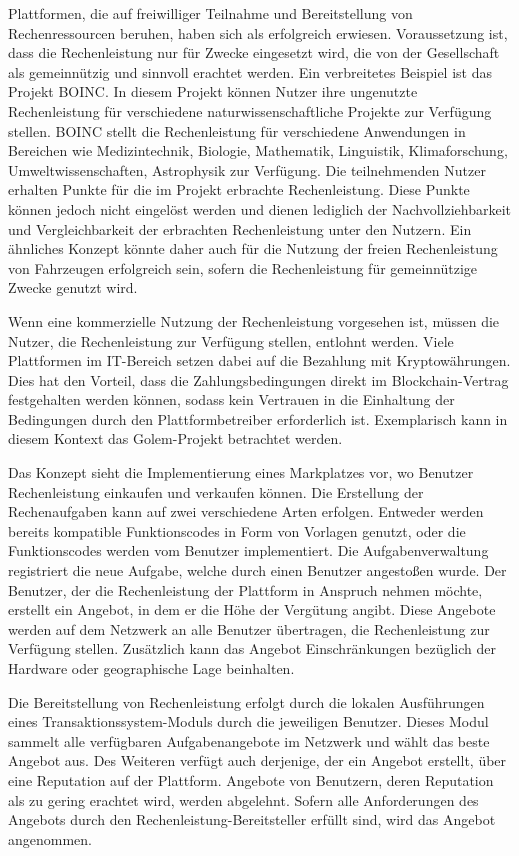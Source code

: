Plattformen, die auf freiwilliger Teilnahme und Bereitstellung von Rechenressourcen beruhen, haben sich als erfolgreich erwiesen. Voraussetzung ist, dass die Rechenleistung nur für Zwecke eingesetzt wird, die von der Gesellschaft als gemeinnützig und sinnvoll erachtet werden. Ein verbreitetes Beispiel ist das Projekt \gls{BOINC}. In diesem Projekt können Nutzer ihre ungenutzte Rechenleistung für verschiedene naturwissenschaftliche Projekte zur Verfügung stellen. \gls{BOINC} stellt die Rechenleistung für verschiedene Anwendungen in Bereichen wie Medizintechnik, Biologie, Mathematik, Linguistik, Klimaforschung, Umweltwissenschaften, Astrophysik zur Verfügung. Die teilnehmenden Nutzer erhalten Punkte für die im Projekt erbrachte Rechenleistung. Diese Punkte können jedoch nicht eingelöst werden und dienen lediglich der Nachvollziehbarkeit und Vergleichbarkeit der erbrachten Rechenleistung unter den Nutzern. Ein ähnliches Konzept könnte daher auch für die Nutzung der freien Rechenleistung von Fahrzeugen erfolgreich sein, sofern die Rechenleistung für gemeinnützige Zwecke genutzt wird.

Wenn eine kommerzielle Nutzung der Rechenleistung vorgesehen ist, müssen die Nutzer, die Rechenleistung zur Verfügung stellen, entlohnt werden. Viele Plattformen im IT-Bereich setzen dabei auf die Bezahlung mit Kryptowährungen. Dies hat den Vorteil, dass die Zahlungsbedingungen direkt im Blockchain-Vertrag festgehalten werden können, sodass kein Vertrauen in die Einhaltung der Bedingungen durch den Plattformbetreiber erforderlich ist. Exemplarisch kann in diesem Kontext das Golem-Projekt betrachtet werden. 

Das Konzept sieht die Implementierung eines Markplatzes vor, wo Benutzer Rechenleistung einkaufen und verkaufen können. Die Erstellung der Rechenaufgaben kann auf zwei verschiedene Arten erfolgen. Entweder werden bereits kompatible Funktionscodes in Form von Vorlagen genutzt, oder die Funktionscodes werden vom Benutzer implementiert. Die Aufgabenverwaltung registriert die neue Aufgabe, welche durch einen Benutzer angestoßen wurde. Der Benutzer, der die Rechenleistung der Plattform in Anspruch nehmen möchte, erstellt ein Angebot, in dem er die Höhe der Vergütung angibt. Diese Angebote werden auf dem Netzwerk an alle Benutzer übertragen, die Rechenleistung zur Verfügung stellen. Zusätzlich kann das Angebot Einschränkungen bezüglich der Hardware oder geographische Lage beinhalten.

Die Bereitstellung von Rechenleistung erfolgt durch die lokalen Ausführungen eines Transaktionssystem-Moduls durch die jeweiligen Benutzer. Dieses Modul sammelt alle verfügbaren Aufgabenangebote im Netzwerk und wählt das beste Angebot aus. Des Weiteren verfügt auch derjenige, der ein Angebot erstellt, über eine Reputation auf der Plattform. Angebote von Benutzern, deren Reputation als zu gering erachtet wird, werden abgelehnt. Sofern alle Anforderungen des Angebots durch den Rechenleistung-Bereitsteller erfüllt sind, wird das Angebot angenommen. 

